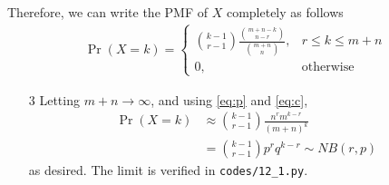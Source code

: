 \documentclass{beamer}
\providecommand{\pr}[1]{\ensuremath{\Pr\left(#1\right)}}
\begin{document}
\begin{frame}
	Therefore, we can write the PMF of $X$ completely as follows
	\begin{align}
		\pr{X = k} =
		\begin{cases}
			\binom{k - 1}{r - 1}\frac{\binom{m + n - k}{n - r}}{\binom{m + n}{n}}, & r \leq k \leq m + n \\
			0, & \textrm{otherwise}
		\end{cases}
		\label{eq:full-pmf}
	\end{align}
	\begin{enumerate}
		\item[3] Letting $m + n \to \infty$, and using \eqref{eq:p} and \eqref{eq:c},
			\begin{align}
				\pr{X = k} &\approx \binom{k - 1}{r - 1}\frac{n^rm^{k - r}}{(m + n)^k} \\
				&= \binom{k - 1}{r - 1}p^rq^{k - r} \sim NB(r, p)
				\label{eq:lim}
			\end{align}
			as desired. The limit is verified in \texttt{codes/12{\_}1.py}.
	\end{enumerate}
\end{frame}
\end{document}
